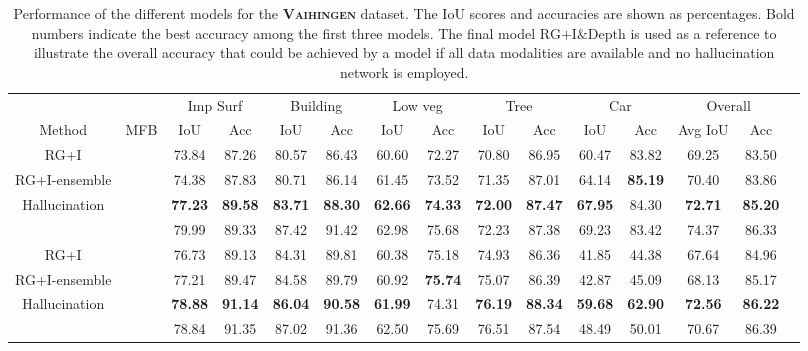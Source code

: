 \documentclass[journal]{IEEEtran}
\newcommand{\cmark}{\ding{51}}%
\newcommand{\xmark}{\ding{55}}%
\begin{document}
\begin{table*}[t]
\begin{center}
\begin{tabular}{lc|c|c|c|c|c|c|c|c|c|c|c|c|c|}
\cline{3-14}
 & & \multicolumn{2}{|c|}{Imp Surf} & \multicolumn{2}{c|}{Building} & \multicolumn{2}{c|}{Low veg} & \multicolumn{2}{c|}{Tree} & \multicolumn{2}{c|}{Car} & \multicolumn{2}{c|}{Overall}\\
\cline{1-14}
\multicolumn{1}{|c|}{Method} & \multicolumn{1}{|c|}{MFB} & IoU & Acc & IoU & Acc & IoU & Acc & IoU & Acc & IoU & Acc & Avg IoU & Acc\\
\cline{1-14}
\multicolumn{1}{|c|}{RG+I} & \cmark & 73.84 & 87.26 & 80.57 & 86.43 & 60.60 & 72.27 & 70.80 & 86.95 & 60.47 & 83.82 & 69.25 & 83.50\\
\cline{2-14}
\multicolumn{1}{|c|}{RG+I-ensemble} & \cmark & 74.38 & 87.83 & 80.71 & 86.14 & 61.45 & 73.52 & 71.35 & 87.01 & 64.14 & {\bf85.19} & 70.40 & 83.86 \\
\cline{2-14}
\multicolumn{1}{|c|}{Hallucination} & \cmark & {\bf77.23} & {\bf89.58} & {\bf83.71} & {\bf88.30} & {\bf62.66} & {\bf74.33} & {\bf72.00} & {\bf87.47} & {\bf67.95} & 84.30 & {\bf72.71} & {\bf85.20} \\
\hdashline
\multicolumn{1}{|c|}{RG+I\&Depth} & \cmark & 79.99 & 89.33 & 87.42 & 91.42 & 62.98 & 75.68 & 72.23 & 87.38 & 69.23 & 83.42 & 74.37 & 86.33 \\
\hline
\hline
\multicolumn{1}{|c|}{RG+I} & \xmark & 76.73 & 89.13 & 84.31 & 89.81 & 60.38 & 75.18 & 74.93 & 86.36 & 41.85 & 44.38 & 67.64 & 84.96\\
\hline
\multicolumn{1}{|c|}{RG+I-ensemble} & \xmark & 77.21 & 89.47 & 84.58 & 89.79 & 60.92 & {\bf75.74} & 75.07 & 86.39 & 42.87 & 45.09 & 68.13 & 85.17 \\
\hline
\multicolumn{1}{|c|}{Hallucination} & \xmark & {\bf78.88} & {\bf91.14} & {\bf86.04} & {\bf90.58} & {\bf61.99} & 74.31 & {\bf76.19} & {\bf88.34} & {\bf59.68} & {\bf62.90} & {\bf72.56} & {\bf86.22}\\
\hdashline
\multicolumn{1}{|c|}{RG+I\&Depth} & \xmark & 78.84 & 91.35 & 87.02 & 91.36 & 62.50 & 75.69 & 76.51 & 87.54 & 48.49 & 50.01 & 70.67 & 86.39\\
\hline
\end{tabular}
\vspace{0.2cm}
\caption{Performance of the different models for the {\bf\scshape Vaihingen} dataset. The IoU scores and accuracies are shown as percentages. Bold numbers indicate the best accuracy among the first three models. The final model $\text{RG+I\&Depth}$ is used as a reference to illustrate the overall accuracy that could be achieved by a model if all data modalities are available and no hallucination network is employed.}
\label{tab:resultsMFBVaihingenIOU}
\end{center}
\end{table*}
\end{document}
